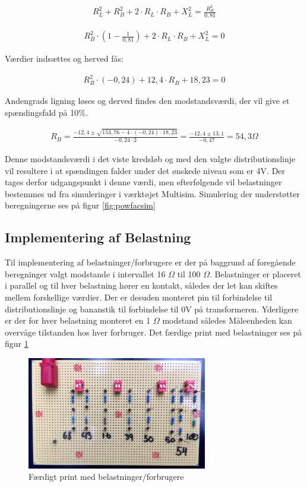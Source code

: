 \begin{align}
R_L^2+R_B^2+2\cdot R_L\cdot R_B+X_L^2=\frac{R_B^2}{0,81}
\end{align}

\begin{align}
R_B^2\cdot (1-\frac{1}{0,81})+2\cdot R_L\cdot R_B+X_L^2=0
\end{align}

Værdier indsættes og herved fås:

\begin{align}
R_B^2\cdot (-0,24) +12,4\cdot R_B+18,23=0
\end{align}

Andengrads ligning løses og derved findes den modstandsværdi, der vil give et spændingsfald på 10\%.

\begin{align}
R_B=\frac{-12,4\pm\sqrt{153,76-4\cdot(-0,24)\cdot18,23}}{-0,24\cdot 2}=\frac{-12,4\pm 13,1}{-0,47}=54,3 \Omega
\end{align}

Denne modstandsværdi i det viste kredsløb og med den valgte distributionslinje vil resultere i at spændingen falder under det ønskede niveau som er 4V. Der tages derfor udgangspunkt i denne værdi, men efterfølgende vil belastninger bestemmes ud fra simuleringer i værktøjet Multisim. Simulering der understøtter beregningerne ses på figur \ref{fig:powfacsim}

\subsection{Implementering af Belastning}
Til implementering af belastninger/forbrugere er der på baggrund af foregående beregninger valgt modstande i intervallet 16 $\Omega$ til 100 $\Omega$. Belastninger er placeret i parallel og til hver belastning hører en kontakt, således der let kan skiftes mellem forskellige værdier. Der er desuden monteret pin til forbindelse til distributionslinje og bananstik til forbindelse til 0V på transformeren. Yderligere er der for hver belastning monteret en 1 $\Omega$ modstand således Måleenheden kan overvåge tilstanden hos hver forbruger. Det færdige print med belastninger ses på figur \ref{fig:Belastning1}

\begin{figure}[H] 
	\centering
	\includegraphics[width=0.7\textwidth]{Figure/Belastningskreds}
	\caption{Færdigt print med belastninger/forbrugere}
	\label{fig:Belastning1}
\end{figure}


